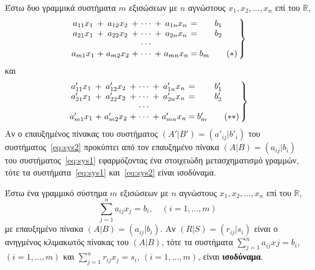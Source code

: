 \begin{thm}
  Έστω δυο γραμμικά συστήματα $m$ εξισώσεων με $n$ αγνώστους 
  $ x_{1}, x_{2}, \ldots, x_{n} $ επί του $ \mathbb{R} $,
  \begin{equation*}\label{eq:sys1}
    \setlength\arraycolsep{1.5pt} 
    \left.
      \begin{array}{ccc ccc c @{\extracolsep{2.5pt}}c
        @{\extracolsep{2.5pt}}c}
        a_{11}x_{1} & + & a_{12}x_{2} & + & \cdots & + & a_{1n}x_{n} & =
                    & b_{1} \\
        a_{21}x_{1} & + & a_{22}x_{2} & + & \cdots & + & a_{2n}x_{n} & =
                    & b_{2} \\
                    & & & & \cdots & &  & &  \\
        a_{m1}x_{1} & + & a_{m2}x_{2} & + & \cdots & + & a_{mn}x_{n} & =
                    & b_{m} \tag{$*$}
      \end{array}
    \right\} 
  \end{equation*} 
  και 
  \begin{equation*}\label{eq:sys2}
    \setlength\arraycolsep{1.5pt} 
    \left.
      \begin{array}{ccc ccc c @{\extracolsep{2.5pt}}c
        @{\extracolsep{2.5pt}}c}
        a'_{11}x_{1} & + & a'_{12}x_{2} & + & \cdots & + & a'_{1n}x_{n} & =
                     & b'_{1} \\
        a'_{21}x_{1} & + & a'_{22}x_{2} & + & \cdots & + & a'_{2n}x_{n} & =
                     & b'_{2} \\
                     & & & & \cdots & &  & &  \\
        a'_{m1}x_{1} & + & a'_{m2}x_{2} & + & \cdots & + & a'_{mn}x_{n} & =
                     & b'_{m} \tag{$**$}
      \end{array}
    \right\} 
  \end{equation*}
  Αν ο επαυξημένος πίνακας του συστήματος $ (A'|B') = (a'_{ij}|b'_{i}) $ του 
  συστήματος~\eqref{eq:sys2} προκύπτει από τον επαυξημένο πίνακα 
  $ (A|B) = (a_{ij}|b_{i}) $ του συστήματος~\eqref{eq:sys1} εφαρμόζοντας ένα στοιχειώδη 
  μετασχηματισμό γραμμών, τότε τα συστήματα~\eqref{eq:sys1} και~\eqref{eq:sys2} είναι 
  ισοδύναμα.
\end{thm}

\begin{cor}\label{cor:1}
  Έστω ένα γραμμικό σύστημα $m$ εξισώσεων με $n$ αγνώστους $ x_{1}, x_{2}, \ldots, x_{n} $
  επί του $ \mathbb{R} $, 
  \[
    \sum_{j=1}^{n} a_{ij}x_{j}=b_{i}, \quad (i=1,\ldots, m)  
   \] 
   με επαυξημένο πίνακα $ (A|B) = (a_{ij}|b_{i}) $. Αν $ (R|S) = (r_{ij}|s_{i}) $ 
   είναι ο ανηγμένος κλιμακωτός πίνακας του $ (A|B) $, τότε τα συστήματα 
   $ \sum_{j=1}^{n} a_{ij}x_{}j=b_{i} $, $ (i=1,\dots, m) $ και $ \sum_{j=1}^{n}
   r_{ij}x_{j}=s_{i}  $, $(i=1,\dots, m) $, είναι \textbf{ισοδύναμα}.
\end{cor}

